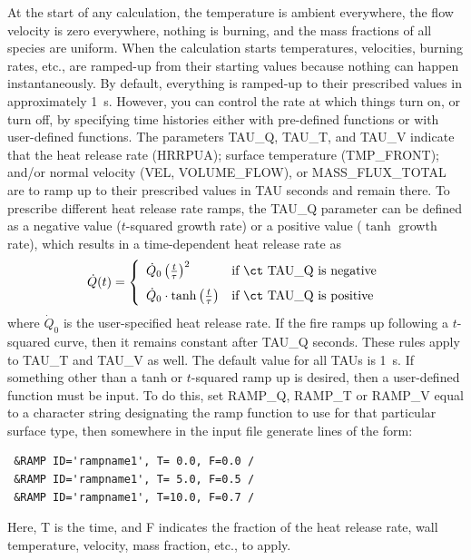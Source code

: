 \documentclass[11pt]{book}
\begin{document}
At the start of any calculation, the temperature is ambient
everywhere, the flow velocity is zero everywhere, nothing is burning,
and the mass fractions of all species are uniform.  When the
calculation starts temperatures, velocities, burning rates,
etc., are ramped-up from their starting values because nothing can
happen instantaneously. By default, everything is ramped-up to their
prescribed values in approximately 1~s. However, you can control the rate at which
things turn on, or turn off, by specifying time histories either with
pre-defined functions or with user-defined functions.  The parameters {\ct
TAU\_Q}, {\ct TAU\_T}, and {\ct TAU\_V} indicate that the heat release
rate ({\ct HRRPUA}); surface temperature ({\ct TMP\_FRONT}); and/or
normal velocity ({\ct VEL}, {\ct VOLUME\_FLOW}), or {\ct
MASS\_FLUX\_TOTAL} are to ramp up to their prescribed values in {\ct
TAU} seconds and remain there. To prescribe different heat release rate ramps, the
{\ct TAU\_Q} parameter can be defined as a negative value ($t$-squared growth rate) or
a positive value ($\tanh$ growth rate), which results in a time-dependent
heat release rate as
\begin{equation}
\dot Q(t) = \left\{ \begin{array}{ll} \dot Q_0 \left( \frac{t}{\tau} \right)^2            &  \mbox{if {\ct TAU\_Q} is negative} \\[.1in]
                                      \dot Q_0 \cdot \tanh \left( \frac{t}{\tau} \right)  &  \mbox{if {\ct TAU\_Q} is positive}  \end{array} \right.
\end{equation}
where $\dot Q_0$ is the user-specified heat release rate. If the
fire ramps up following a $t$-squared curve, then it remains constant after
{\ct TAU\_Q} seconds.  These rules apply to {\ct TAU\_T} and {\ct TAU\_V} as well.
The default value for all {\ct TAU}s is 1~s.  If something other than a tanh or
$t$-squared ramp up is desired, then a user-defined function must be input. To
do this, set {\ct RAMP\_Q}, {\ct RAMP\_T} or {\ct RAMP\_V} equal to a
character string designating the ramp function to use for that
particular surface type, then somewhere in the input file generate
lines of the form:
\begin{lstlisting}
 &RAMP ID='rampname1', T= 0.0, F=0.0 /
 &RAMP ID='rampname1', T= 5.0, F=0.5 /
 &RAMP ID='rampname1', T=10.0, F=0.7 /
\end{lstlisting}
Here, {\ct T} is the time, and {\ct F} indicates the fraction of the heat
release rate, wall temperature, velocity, mass fraction, etc., to apply.
\end{document}
